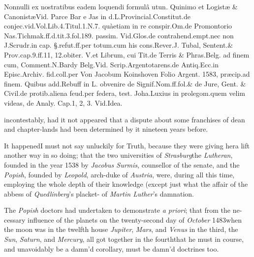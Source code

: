 \documentclass{article}
\begin{document}
\vfill
\begingroup\footnotesize
\indent\fnast\enspace Nonnulli ex nostratibus eadem loquendi 
formulâ utun. Quinimo et Logistæ \& Canonistæ\tsh Vid.\@
Parce Bar e Jas in d.\@ L.\@ Provincial.Constitut.\break de
conjec.\@ vid.\@ Vol.\@ Lib.\@ 4.\@ Titul.\@ 1.\@ N.\@ 7.\@
quà\break etiam in re conspir.\@ Om.\@ de Promontorio
Nas.\break Tichmak.\@ ff.\@ d.\@ tit.\@ 3.\@ fol.\@ 189.\@
passim. Vid.\@ Glos.\break de contrahend.\@ empt.\etc nec
non J.\@ Scrudr.\@ in cap.\break 
§.\@ refut.\@ ff.\@ per totum.\@ cum his cons.\@ Rever.\@ J.\break
Tubal, Sentent.\@ \& Prov.\@ cap.\@ 9.\@ ff.\@ 11, 12.\@ obiter.\break  
V.\@ et Librum, cui Tit.\@ de Terris \& Phras.\@ Belg.\break
ad finem cum, Comment.\@ N.\@ Bardy Belg.\@ Vid.\break
Scrip.\@ Argentotarens.\@ de Antiq.\@ Ecc.\@ in Episc.\@ Ar\-chiv.\@
fid.\@ coll.\@ per Von Jacobum Koinshoven Fo\-lio Argent.\@
1583, præcip.\@ ad finem.  Quibus add.\@ Rebuff in L.\@
obvenire de Signif.\@ Nom.\@ ff.\@ fol.\@ \& de Jure, Gent.\@
\& Civil.\@ de protib.\@ aliena feud.\@ per federa, test.\@
Joha.\@ Luxius in prolegom.\@ quem velim videas, de Analy.\@
Cap.\@ 1, 2, 3. Vid.\@ Idea.\par\endgroup

\newpage\noindent
incontestably, had it not appeared that a dispute
about some franchises of dean and chapter-lands had been determined by it
nineteen years before.

It happened\tsk I must not say unluckily for Truth, because
they were giving her\break a lift another way in so doing;
that the two universities of \textit{Strasburg}\tsk the
\textit{Luthe\-ran}, founded in the year 1538 by
\textit{Jacobus Surmis}, counsellor of the senate,\tsk
and\break
the \textit{Popish}, founded by \textit{Leopold}, arch-duke
of \textit{Austria}, were, during all this time,\break 
employing the whole depth of their\break 
knowledge (except just what the affair\break
of the abbess of \textit{Quedlinberg}’s placket-\break
{}
of \textit{Martin Luther}’s damnation.

The \textit{Popish} doctors had undertaken to demonstrate
\textit{a priori}; that from the ne- cessary influence of the
planets on the twenty-second day of \textit{October}
1483\tsh when the moon was in the twelfth house\break
\tsk \textit{Jupiter}, \textit{Mars}, and \textit{Venus} in the third,\break
the \textit{Sun}, \textit{Saturn}, and \textit{Mercury}, all got together
in the fourth\tsk that he must in course, and unavoidably
be a damn’d\break
{}
corollary, must be damn’d doctrines too.
\end{document}
